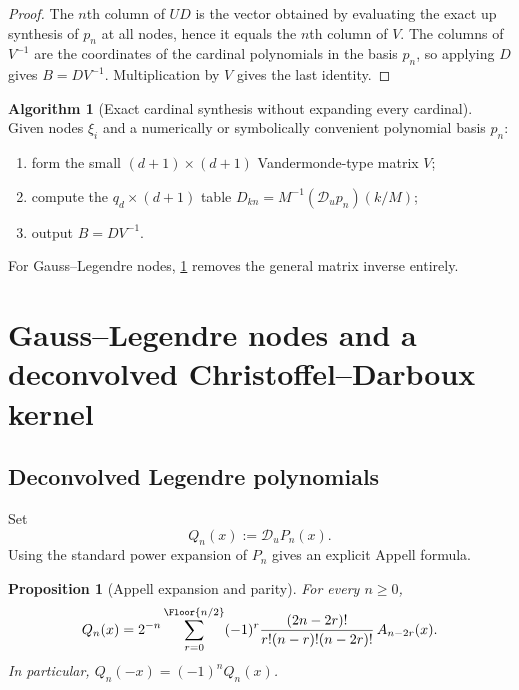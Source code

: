 \documentclass[11pt]{article}
\newtheorem{proposition}[theorem]{Proposition}
\theoremstyle{definition}
\newtheorem{algorithm}[theorem]{Algorithm}
\theoremstyle{remark}
\newcommand{\Dscr}{\mathscr D_{u}}
\begin{document}
\begin{proof}
The $n$th column of $UD$ is the vector obtained by evaluating the exact up
synthesis of $p_n$ at all nodes, hence it equals the $n$th column of $V$.
The columns of $V^{-1}$ are the coordinates of the cardinal polynomials in the
basis $p_n$, so applying $D$ gives $B=DV^{-1}$.  Multiplication by $V$ gives
the last identity.
\end{proof}

\begin{algorithm}[Exact cardinal synthesis without expanding every cardinal]
\label{alg:cardinal}
Given nodes $\xi_i$ and a numerically or symbolically convenient polynomial
basis $p_n$:
\begin{enumerate}
  \item form the small $(d+1)\times(d+1)$ Vandermonde-type matrix $V$;
  \item compute the $q_d\times(d+1)$ table
  $D_{kn}=M^{-1}(\Dscr p_n)(k/M)$;
  \item output $B=DV^{-1}$.
\end{enumerate}
For Gauss--Legendre nodes, \cref{sec:gauss} removes the general matrix inverse
entirely.
\end{algorithm}

\section{Gauss--Legendre nodes and a deconvolved Christoffel--Darboux kernel}
\label{sec:gauss}

\subsection{Deconvolved Legendre polynomials}

Set
\begin{equation}
 Q_n(x):=\Dscr P_n(x).
 \label{eq:Q-def}
\end{equation}
Using the standard power expansion of $P_n$ gives an explicit Appell formula.

\begin{proposition}[Appell expansion and parity]
\label{prop:Q-expansion}
For every $n\ge0$,
\begin{equation}
 Q_n(x)=2^{-n}\sum_{r=0}^{\Floor{n/2}}(-1)^r
 \frac{(2n-2r)!}{r!(n-r)!(n-2r)!}\,A_{n-2r}(x).
 \label{eq:Q-expansion}
\end{equation}
In particular, $Q_n(-x)=(-1)^nQ_n(x)$.
\end{proposition}
\end{document}
